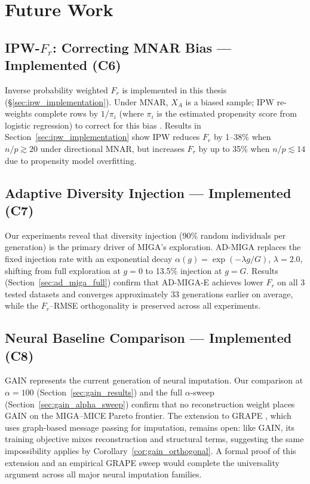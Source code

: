
\section{Future Work}

\subsection{IPW-$F_r$: Correcting MNAR Bias --- Implemented (C6)}
\label{sec:future_ipw}

Inverse probability weighted $F_r$ is implemented in this thesis (\S\ref{sec:ipw_implementation}). Under MNAR, $X_A$ is a biased sample; IPW re-weights complete rows by $1/\pi_i$ (where $\pi_i$ is the estimated propensity score from logistic regression) to correct for this bias \cite{HorvitzThompson1952}. Results in Section~\ref{sec:ipw_implementation} show IPW reduces $F_r$ by 1--38\% when $n/p \gtrsim 20$ under directional MNAR, but increases $F_r$ by up to 35\% when $n/p \lesssim 14$ due to propensity model overfitting.

\subsection{Adaptive Diversity Injection --- Implemented (C7)}

Our experiments reveal that diversity injection (90\% random individuals per generation) is the primary driver of MIGA's exploration. AD-MIGA replaces the fixed injection rate with an exponential decay $\alpha(g) = \exp(-\lambda g/G)$, $\lambda=2.0$, shifting from full exploration at $g=0$ to 13.5\% injection at $g=G$. Results (Section~\ref{sec:ad_miga_full}) confirm that AD-MIGA-E achieves lower $F_r$ on all 3 tested datasets and converges approximately 33 generations earlier on average, while the $F_r$--RMSE orthogonality is preserved across all experiments.

\subsection{Neural Baseline Comparison --- Implemented (C8)}
\label{sec:future_neural}

GAIN \cite{Yoon2018} represents the current generation of neural imputation. Our comparison at $\alpha=100$ (Section~\ref{sec:gain_results}) and the full $\alpha$-sweep (Section~\ref{sec:gain_alpha_sweep}) confirm that no reconstruction weight places GAIN on the MIGA--MICE Pareto frontier. The extension to GRAPE \cite{You2020}, which uses graph-based message passing for imputation, remains open: like GAIN, its training objective mixes reconstruction and structural terms, suggesting the same impossibility applies by Corollary~\ref{cor:gain_orthogonal}. A formal proof of this extension and an empirical GRAPE sweep would complete the universality argument across all major neural imputation families.

